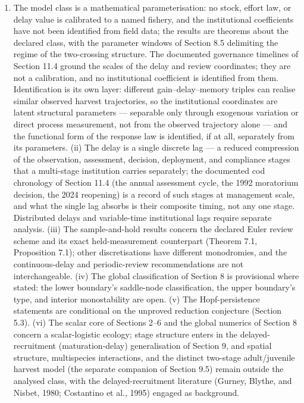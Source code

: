 \documentclass[11pt]{article}
\providecommand{\tightlist}{\setlength{\itemsep}{0pt}\setlength{\parskip}{0pt}}
\begin{document}
\begin{enumerate}
\def\labelenumi{(\roman{enumi})}
\tightlist
\item
  The model class is a mathematical parameterisation: no stock, effort
  law, or delay value is calibrated to a named fishery, and the
  institutional coefficients have not been identified from field data;
  the results are theorems about the declared class, with the parameter
  windows of Section 8.5 delimiting the regime of the two-crossing
  structure. The documented governance timelines of Section 11.4 ground
  the scales of the delay and review coordinates; they are not a
  calibration, and no institutional coefficient is identified from them.
  Identification is its own layer: different gain--delay--memory triples
  can realise similar observed harvest trajectories, so the
  institutional coordinates are latent structural parameters ---
  separable only through exogenous variation or direct process
  measurement, not from the observed trajectory alone --- and the
  functional form of the response law is identified, if at all,
  separately from its parameters. (ii) The delay is a single discrete
  lag --- a reduced compression of the observation, assessment,
  decision, deployment, and compliance stages that a multi-stage
  institution carries separately; the documented cod chronology of
  Section 11.4 (the annual assessment cycle, the 1992 moratorium
  decision, the 2024 reopening) is a record of such stages at management
  scale, and what the single lag absorbs is their composite timing, not
  any one stage. Distributed delays and variable-time institutional lags
  require separate analysis. (iii) The sample-and-hold results concern
  the declared Euler review scheme and its exact held-measurement
  counterpart (Theorem 7.1, Proposition 7.1); other discretisations have
  different monodromies, and the continuous-delay and periodic-review
  recommendations are not interchangeable. (iv) The global
  classification of Section 8 is provisional where stated: the lower
  boundary's saddle-node classification, the upper boundary's type, and
  interior monostability are open. (v) The Hopf-persistence statements
  are conditional on the unproved reduction conjecture (Section 5.3).
  (vi) The scalar core of Sections 2--6 and the global numerics of
  Section 8 concern a scalar-logistic ecology; stage structure enters in
  the delayed-recruitment (maturation-delay) generalisation of Section
  9, and spatial structure, multispecies interactions, and the distinct
  two-stage adult/juvenile harvest model (the separate companion of
  Section 9.5) remain outside the analysed class, with the
  delayed-recruitment literature (Gurney, Blythe, and Nisbet, 1980;
  Costantino et al., 1995) engaged as background.
\end{enumerate}
\end{document}
